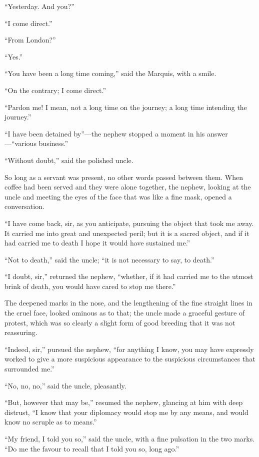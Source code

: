 ``Yesterday.  And you?''

``I come direct.''

``From London?''

``Yes.''

``You have been a long time coming,'' said the Marquis, with a smile.

``On the contrary; I come direct.''

``Pardon me!  I mean, not a long time on the journey; a long time
intending the journey.''

``I have been detained by''---the nephew stopped a moment in his
answer---``various business.''

``Without doubt,'' said the polished uncle.

So long as a servant was present, no other words passed between them.
When coffee had been served and they were alone together, the nephew,
looking at the uncle and meeting the eyes of the face that was like a
fine mask, opened a conversation.

``I have come back, sir, as you anticipate, pursuing the object that
took me away.  It carried me into great and unexpected peril; but it
is a sacred object, and if it had carried me to death I hope it would
have sustained me.''

``Not to death,'' said the uncle; ``it is not necessary to say, to death.''

``I doubt, sir,'' returned the nephew, ``whether, if it had carried me
to the utmost brink of death, you would have cared to stop me there.''

The deepened marks in the nose, and the lengthening of the fine
straight lines in the cruel face, looked ominous as to that; the
uncle made a graceful gesture of protest, which was so clearly a
slight form of good breeding that it was not reassuring.

``Indeed, sir,'' pursued the nephew, ``for anything I know, you may
have expressly worked to give a more suspicious appearance to the
suspicious circumstances that surrounded me.''

``No, no, no,'' said the uncle, pleasantly.

``But, however that may be,'' resumed the nephew, glancing at him with
deep distrust, ``I know that your diplomacy would stop me by any
means, and would know no scruple as to means.''

``My friend, I told you so,'' said the uncle, with a fine pulsation in
the two marks.  ``Do me the favour to recall that I told you so, long ago.''


